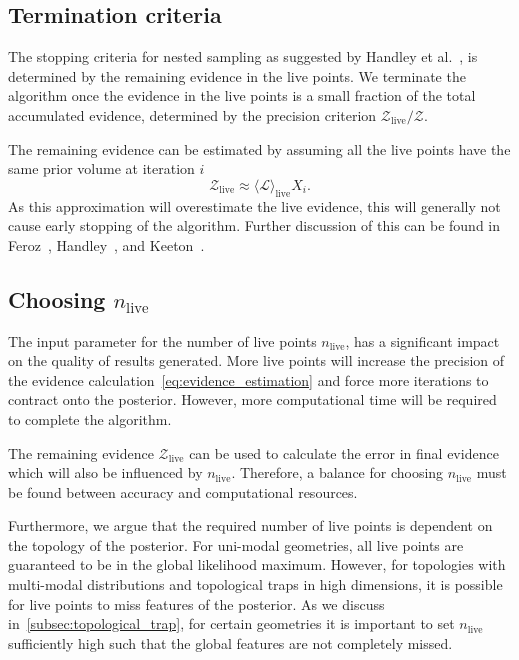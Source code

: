 \documentclass[11pt]{article}
\begin{document}
    \subsection{Termination criteria}\label{subsec:termination_criteria}
    The stopping criteria for nested sampling as suggested by Handley et al.~\cite{Handley_2015}, is determined by
    the remaining evidence in the live points.
    We terminate the algorithm once the evidence in the live points is a small fraction of the total accumulated evidence,
    determined by the precision criterion $\mathcal{Z}_{\text{live}} / \mathcal{Z}$.

    The remaining evidence can be estimated by assuming all the live points have the same prior volume at iteration $i$
    \begin{equation}\label{eq:remaining_evidence}
    \mathcal{Z}_{\text{live}} \approx \langle \mathcal{L} \rangle_{\text{live}} X_i.
    \end{equation}
    As this approximation will overestimate the live evidence, this will generally not cause early stopping of the algorithm.
    Further discussion of this can be found in Feroz~\cite{Feroz_2009}, Handley~\cite{Handley_2015}, and
    Keeton~\cite{keeton2011statistical}.

    \subsection{Choosing $n_{\text{live}}$}\label{subsec:ns_termination}
    The input parameter for the number of live points $n_{\text{live}}$, has a significant impact on the quality of results generated.
    More live points will increase the precision of the evidence calculation~\eqref{eq:evidence_estimation} and force more
    iterations to contract onto the posterior.
    However, more computational time will be required to complete the algorithm.

    The remaining evidence $\mathcal{Z}_{\text{live}}$ can be used to calculate the error in final
    evidence~\cite{keeton2011statistical, Handley_2015} which will also be influenced by $n_{\text{live}}$.
    Therefore, a balance for choosing $n_{\text{live}}$ must be found between accuracy and computational resources.

    Furthermore, we argue that the required number of live points is dependent on the topology of the posterior.
    For uni-modal geometries, all live points are guaranteed to be in the global likelihood maximum.
    However, for topologies with multi-modal distributions and topological traps in high dimensions,
    it is possible for live points to miss features of the posterior.
    As we discuss in~\cref{subsec:topological_trap}, for certain geometries it is important to
    set $n_{\text{live}}$ sufficiently high such that the global features are not completely missed.
\end{document}
